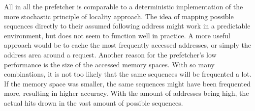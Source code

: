 All in all the prefetcher is comparable to a deterministic implementation of the more stochastic principle of locality approach. The idea of mapping possible sequences directly to their assumed following address might work in a predictable environment, but does not seem to function well in practice. A more useful approach would be to cache the most frequently accessed addresses, or simply the address area around a request. Another reason for the prefetcher's low performance is the size of the accessed memory spaces. With so many combinations, it is not too likely that the same sequences will be frequented a lot. If the memory space was smaller, the same sequences might have been frequented more, resulting in higher accuracy. With the amount of addresses being high, the actual hits drown in the vast amount of possible sequences.